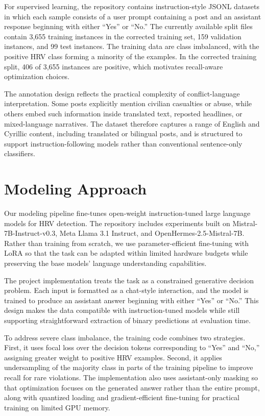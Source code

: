 \documentclass[letterpaper]{article}
\begin{document}
For supervised learning, the repository contains instruction-style JSONL datasets in which each sample consists of a user prompt containing a post and an assistant response beginning with either ``Yes'' or ``No.'' The currently available split files contain 3{,}655 training instances in the corrected training set, 159 validation instances, and 99 test instances. The training data are class imbalanced, with the positive HRV class forming a minority of the examples. In the corrected training split, 406 of 3{,}655 instances are positive, which motivates recall-aware optimization choices.

The annotation design reflects the practical complexity of conflict-language interpretation. Some posts explicitly mention civilian casualties or abuse, while others embed such information inside translated text, reposted headlines, or mixed-language narratives. The dataset therefore captures a range of English and Cyrillic content, including translated or bilingual posts, and is structured to support instruction-following models rather than conventional sentence-only classifiers.

\section{Modeling Approach}
Our modeling pipeline fine-tunes open-weight instruction-tuned large language models for HRV detection. The repository includes experiments built on Mistral-7B-Instruct-v0.3, Meta Llama 3.1 Instruct, and OpenHermes-2.5-Mistral-7B. Rather than training from scratch, we use parameter-efficient fine-tuning with LoRA so that the task can be adapted within limited hardware budgets while preserving the base models' language understanding capabilities.

The project implementation treats the task as a constrained generative decision problem. Each input is formatted as a chat-style interaction, and the model is trained to produce an assistant answer beginning with either ``Yes'' or ``No.'' This design makes the data compatible with instruction-tuned models while still supporting straightforward extraction of binary predictions at evaluation time.

To address severe class imbalance, the training code combines two strategies. First, it uses focal loss over the decision tokens corresponding to ``Yes'' and ``No,'' assigning greater weight to positive HRV examples. Second, it applies undersampling of the majority class in parts of the training pipeline to improve recall for rare violations. The implementation also uses assistant-only masking so that optimization focuses on the generated answer rather than the entire prompt, along with quantized loading and gradient-efficient fine-tuning for practical training on limited GPU memory.
\end{document}
